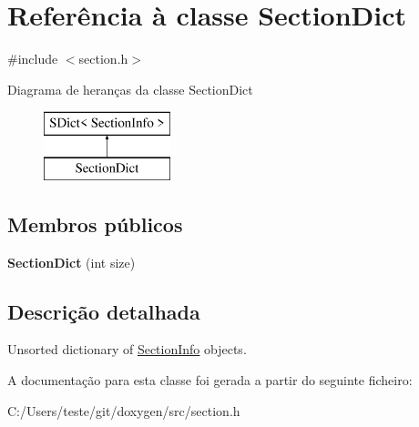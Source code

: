 \hypertarget{class_section_dict}{\section{Referência à classe Section\-Dict}
\label{class_section_dict}
}


{\ttfamily \#include $<$section.\-h$>$}

Diagrama de heranças da classe Section\-Dict\begin{figure}[H]
\begin{center}
\leavevmode
\includegraphics[height=2.000000cm]{class_section_dict}
\end{center}
\end{figure}
\subsection*{Membros públicos}
\begin{DoxyCompactItemize}
\item 
\hypertarget{class_section_dict_a2cf004f6a989eec95714117ff2b9cce5}{{\bfseries Section\-Dict} (int size)}\label{class_section_dict_a2cf004f6a989eec95714117ff2b9cce5}

\end{DoxyCompactItemize}


\subsection{Descrição detalhada}
Unsorted dictionary of \hyperlink{struct_section_info}{Section\-Info} objects. 

A documentação para esta classe foi gerada a partir do seguinte ficheiro\-:\begin{DoxyCompactItemize}
\item 
C\-:/\-Users/teste/git/doxygen/src/section.\-h\end{DoxyCompactItemize}
